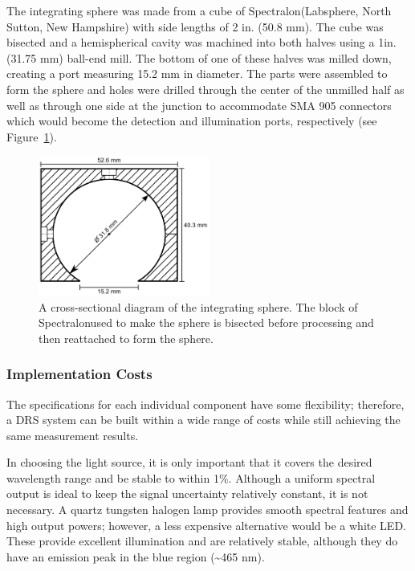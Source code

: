 The integrating sphere was made from a cube of Spectralon\textregistered (Labsphere\textregistered, North Sutton, New Hampshire) with side lengths of 2 in. (50.8 mm). The cube was bisected and a hemispherical cavity was machined into both halves using a 1\textonequarter in. (31.75 mm) ball-end mill. The bottom of one of these halves was milled down, creating a port measuring 15.2 mm in diameter. The parts were assembled to form the sphere and holes were drilled through the center of the unmilled half as well as through one side at the junction to accommodate SMA 905 connectors which would become the detection and illumination ports, respectively (see Figure~\ref{fig:p1-intsphere_schematic}).

\begin{figure}
	\centering \includegraphics[width=0.5\textwidth]{figures/p1-intsphere_schematic.png}
	\caption[Cross-sectional diagram of the integrating sphere]{\label{fig:p1-intsphere_schematic}A cross-sectional diagram of the integrating sphere. The block of Spectralon\textregistered used to make the sphere is bisected before processing and then reattached to form the sphere.}
\end{figure}

\subsubsection{Implementation Costs}
The specifications for each individual component have some flexibility; therefore, a DRS system can be built within a wide range of costs while still achieving the same measurement results.

In choosing the light source, it is only important that it covers the desired wavelength range and be stable to within 1\%. Although a uniform spectral output is ideal to keep the signal uncertainty relatively constant, it is not necessary. A quartz tungsten halogen lamp provides smooth spectral features and high output powers; however, a less expensive alternative would be a white LED. These provide excellent illumination and are relatively stable, although they do have an emission peak in the blue region (\textasciitilde465 nm).

